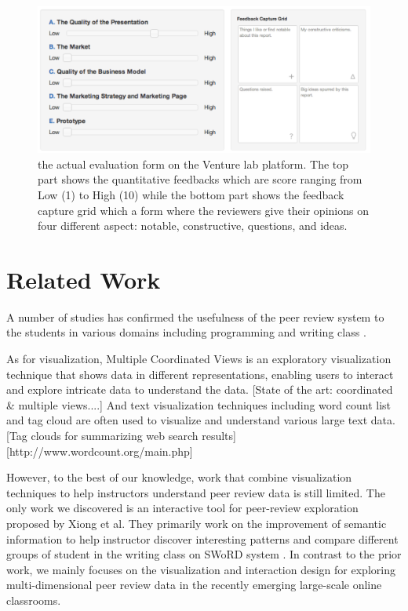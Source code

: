 \documentclass{sigchi}
\begin{document}
\begin{figure}[!t]
\centering
\includegraphics[width=\columnwidth]{images/review-form}
\caption{the actual evaluation form on the Venture lab platform.
The top part shows the quantitative feedbacks which are score ranging
from Low (1) to High (10) while the bottom part shows the feedback capture grid
which a form where the reviewers give their opinions
on four different aspect: notable, constructive, questions, and ideas.}
\label{fig:review-form}
\end{figure}


\section{Related Work}

A number of studies has confirmed the usefulness of the peer review system
to the students in various domains including programming and writing class
\cite{MyPeerReview,WebBasedPeerReview}.

As for visualization, Multiple Coordinated Views is an exploratory visualization
technique that shows data in different representations, enabling users to
interact and explore intricate data to understand the data.  [State of the art:
coordinated \& multiple views....] And text visualization techniques including
word count list and tag cloud are often used to visualize and understand various
large text data.[Tag clouds for summarizing web search
results][http://www.wordcount.org/main.php]


However, to the best of our knowledge, work that combine visualization techniques
to help instructors understand peer review data is still limited.
The only work we discovered is  an interactive tool for peer-review exploration
proposed by Xiong et al. \cite{xiong}
They primarily work on the improvement of semantic information
to help instructor discover interesting patterns and
compare different groups of student in the writing class on SWoRD system \cite{Cho2007}.
In contrast to the prior work, we mainly focuses on the visualization
and interaction design for exploring multi-dimensional peer review data
in the recently emerging large-scale online classrooms.
\end{document}
